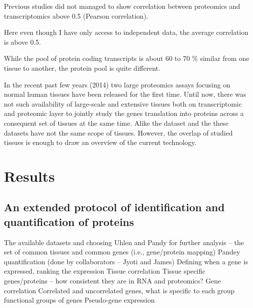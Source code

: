 Previous studies did not managed to show correlation between proteomics and
transcriptomics above 0.5 (Pearson correlation).

Here even though I have only access to independent data, the average correlation is above 0.5.

While the pool of protein coding transcripts is about 60 to 70 \% similar from
one tissue to another, the protein pool is quite different.

In the recent past few years (2014) two large proteomics assays focusing on normal
human tissues have been released for the first time.
Until now, there was not such availability of large-scale and extensive tissues
both on transcriptomic and proteomic layer to jointly study the genes
translation into proteins across a consequent set of tissues
at the same time. Alike the  dataset and the 
these datasets have not the same scope of tissues. However, the overlap of
studied tissues is enough to draw an overview of the current technology.

\section{Results}

\subsection{}

\subsection{An extended protocol of identification and quantification of proteins}


The available datasets and choosing Uhlen and Pandy for further analysis – the set of common tissues and common genes (i.e., gene/protein mapping)
Pandey quantification (done by collaborators – Jyoti and James)
Defining when a gene is expressed, ranking the expression
Tissue correlation
Tissue specific genes/proteins – how consistent they are in RNA and proteomics?
Gene correlation
Correlated and uncorrelated genes, what is specific to each group
functional groups of genes
Pseudo-gene expression




